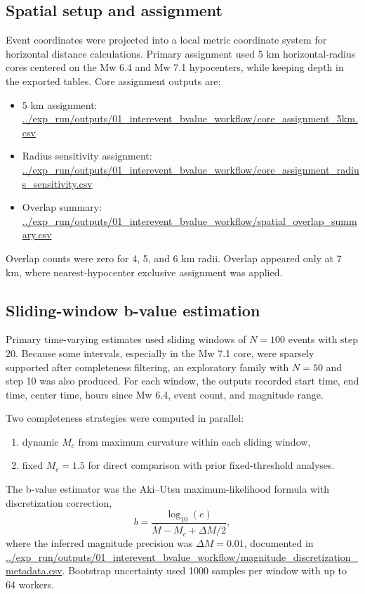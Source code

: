 \documentclass[11pt]{article}
\begin{document}
\subsection{Spatial setup and assignment}
Event coordinates were projected into a local metric coordinate system for horizontal distance calculations. Primary assignment used 5 km horizontal-radius cores centered on the Mw 6.4 and Mw 7.1 hypocenters, while keeping depth in the exported tables. Core assignment outputs are:
\begin{itemize}[leftmargin=1.5em]
    \item 5 km assignment: \url{../exp_run/outputs/01_interevent_bvalue_workflow/core_assignment_5km.csv}
    \item Radius sensitivity assignment: \url{../exp_run/outputs/01_interevent_bvalue_workflow/core_assignment_radius_sensitivity.csv}
    \item Overlap summary: \url{../exp_run/outputs/01_interevent_bvalue_workflow/spatial_overlap_summary.csv}
\end{itemize}
Overlap counts were zero for 4, 5, and 6 km radii. Overlap appeared only at 7 km, where nearest-hypocenter exclusive assignment was applied.

\subsection{Sliding-window b-value estimation}
Primary time-varying estimates used sliding windows of $N=100$ events with step 20. Because some intervals, especially in the Mw 7.1 core, were sparsely supported after completeness filtering, an exploratory family with $N=50$ and step 10 was also produced. For each window, the outputs recorded start time, end time, center time, hours since Mw 6.4, event count, and magnitude range.

Two completeness strategies were computed in parallel:
\begin{enumerate}[leftmargin=1.5em]
    \item dynamic $M_c$ from maximum curvature within each sliding window,
    \item fixed $M_c=1.5$ for direct comparison with prior fixed-threshold analyses.
\end{enumerate}
The b-value estimator was the Aki--Utsu maximum-likelihood formula with discretization correction,
\[
 b = \frac{\log_{10}(e)}{\overline{M} - M_c + \Delta M/2},
\]
where the inferred magnitude precision was $\Delta M=0.01$, documented in \url{../exp_run/outputs/01_interevent_bvalue_workflow/magnitude_discretization_metadata.csv}. Bootstrap uncertainty used 1000 samples per window with up to 64 workers.
\end{document}
